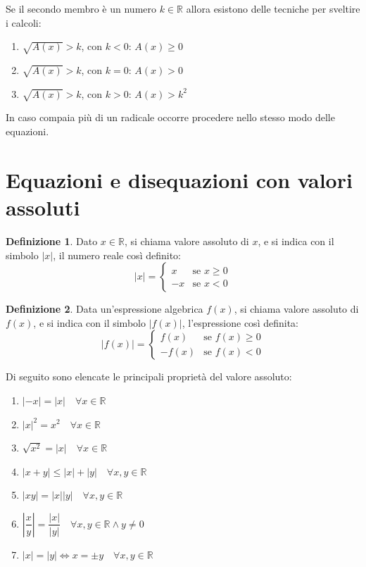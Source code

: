 \documentclass[a4paper]{article}
\theoremstyle{plain}
\theoremstyle{definition}
\newtheorem{definizione}{Definizione}
\theoremstyle{remark}
\newcommand{\R}{\mathbb{R}}
\begin{document}
Se il secondo membro è un numero $k\in\R$ allora esistono delle tecniche per sveltire i calcoli:
\begin{enumerate}
    \item $\sqrt{A(x)}>k$, con $k<0$: $A(x)\geq0$
    \item $\sqrt{A(x)}>k$, con $k=0$: $A(x)>0$
    \item $\sqrt{A(x)}>k$, con $k>0$: $A(x)>k^2$
\end{enumerate}
In caso compaia più di un radicale occorre procedere nello stesso modo delle equazioni.
\newpage
\section{Equazioni e disequazioni con valori assoluti}
\begin{definizione}
    Dato $x\in \R$, si chiama valore assoluto di $x$, e si indica con il simbolo $|x|$, il numero reale così definito:
    \begin{equation}
        |x|=\begin{cases}
            x&\text{se }x\geq0\\
            -x&\text{se }x<0
        \end{cases}
    \end{equation}
\end{definizione}
\begin{definizione}
    Data un'espressione algebrica $f(x)$, si chiama valore assoluto di $f(x)$, e si indica con il simbolo $|f(x)|$, l'espressione così definita:
    \begin{equation}
        |f(x)|=\begin{cases}
            f(x)&\text{se }f(x)\geq0\\
            -f(x)&\text{se }f(x)<0
        \end{cases}
    \end{equation}
\end{definizione}
Di seguito sono elencate le principali proprietà del valore assoluto:
\begin{enumerate}
    \item $|-x|=|x|\quad \forall x\in\R$
    \item $|x|^2=x^2\quad \forall x\in\R$
    \item $\sqrt{x^2}=|x|\quad \forall x\in\R$
    \item $|x+y|\leq|x|+|y|\quad\forall x,y\in\R$
    \item $|xy|=|x||y|\quad\forall x,y\in\R$
    \item $\left|\dfrac{x}{y}\right|=\dfrac{|x|}{|y|}\quad\forall x,y\in\R\land y\ne0$
    \item $|x|=|y|\iff x=\pm y\quad\forall x,y\in\R$
\end{enumerate}
\end{document}
